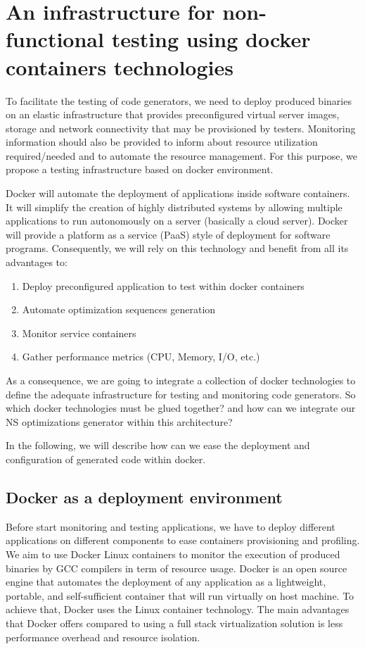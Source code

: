\section{An infrastructure for non-functional testing using docker containers
technologies}

To facilitate the testing of code generators, we need to deploy produced binaries on an elastic infrastructure that
provides preconfigured virtual server images, storage and network connectivity that may be
provisioned by testers. Monitoring information should also be provided to inform about resource utilization required/needed and to automate the resource management. For this purpose, we propose a testing infrastructure based on docker environment. 

Docker will automate the deployment of applications inside software containers. It will simplify the creation
of highly distributed systems by allowing multiple applications to run autonomously on a server
(basically a cloud server). Docker will provide a platform as a service (PaaS) style of
deployment for software programs. Consequently, we will rely on this technology and benefit from all its advantages to:
\begin{enumerate}
	\item Deploy preconfigured application to test within docker containers
	\item Automate optimization sequences generation
	\item Monitor service containers
	\item Gather performance metrics (CPU, Memory, I/O, etc.)
\end{enumerate}
As a consequence, we are going to integrate a collection of docker technologies to define the adequate infrastructure for testing and monitoring code generators. So which docker technologies must be glued together? and how can we integrate our NS optimizations generator within this architecture?

In the following,  we will describe how can we ease the deployment and configuration of generated code within docker.
\subsection{Docker as a deployment environment}
Before start monitoring and testing applications, we have to deploy different applications on different components to ease containers provisioning and profiling.
We aim to use Docker Linux containers to monitor the execution of produced binaries by GCC compilers in term of resource usage. 
Docker is an open source engine that automates the deployment of any application as a
lightweight, portable, and self-sufficient container that will run virtually on host machine. To achieve that, Docker uses the Linux container technology. The main advantages that Docker offers compared to using a full stack virtualization solution is less performance overhead and resource isolation.

